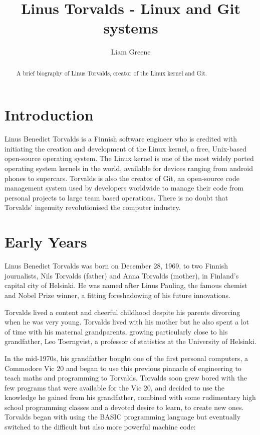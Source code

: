 \documentclass{article}
\begin{document}
\title{Linus Torvalds - Linux and Git systems} \author{Liam Greene}

\maketitle

\begin{abstract}  A brief biography of Linus Torvalds, creator of the Linux kernel and Git. \end{abstract}

\section{Introduction}  Linus Benedict Torvalds is a Finnish software engineer who is credited with initiating the creation and development of the Linux kernel, a free, Unix-based open-source operating system. The Linux kernel is one of the most widely ported operating system kernels in the world, available for devices ranging from android phones to supercars. Torvalds is also the creator of Git, an open-source code management system used by developers worldwide to manage their code from personal projects to large team based operations.  There is no doubt that Torvalds' ingenuity revolutionised the computer industry.  

\section{Early Years}Linus Benedict Torvalds was born on December 28, 1969, to two Finnish journalists,  Nils Torvalds (father) and Anna Torvalds (mother), in Finland's capital city of Helsinki. He was named after Linus Pauling, the famous chemist and Nobel Prize winner, a fitting foreshadowing of his future innovations. \newline \newline

Torvalds lived a content and cheerful childhood despite his parents divorcing when he was very young. Torvalds lived with his mother but he also spent a lot of time with his maternal grandparents, growing particularly close to his grandfather, Leo Toerngvist, a professor of statistics at the University of Helsinki. \cite{interview} \newline \newline

 In the mid-1970s, his grandfather bought one of the first personal computers, a Commodore Vic 20 and began to use this previous pinnacle of engineering to teach maths and programming to Torvalds. Torvalds soon grew bored with the few programs that were available for the Vic 20, and decided to use the knowledge he gained from his grandfather, combined with some rudimentary high school programming classes and a devoted desire to learn, to create new ones. Torvalds began with using the BASIC programming language but eventually switched to the difficult but also more powerful machine code: \newline \newline 
\end{document}
